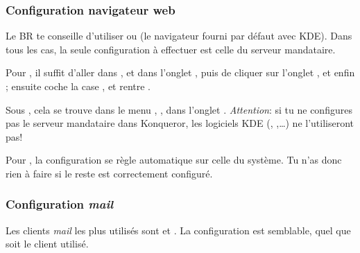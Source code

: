 %

\subsubsection{Configuration navigateur web}

 Le BR te conseille d'utiliser  ou
 (le navigateur fourni par d\'efaut avec KDE). Dans tous les cas, la seule
configuration \`a  effectuer est celle du serveur mandataire.

Pour , il suffit d'aller dans ,  et dans l'onglet , puis de cliquer sur l'onglet
, et enfin  ; ensuite coche la case , et rentre 
.

Sous , cela se trouve dans le menu , ,
dans l'onglet . \emph{Attention}: si tu ne configures pas le serveur mandataire dans Konqueror,
les logiciels KDE (, ,\dots) ne l'utiliseront pas!

Pour , la configuration se règle automatique sur celle du système. Tu n'as donc rien à faire si le reste est correctement configuré.


\pagebreak

\subsubsection{Configuration \emph{mail}}

 Les clients \emph{mail} les plus
utilis\'es sont  et . La configuration est semblable, quel que soit le
client utilis\'e.

